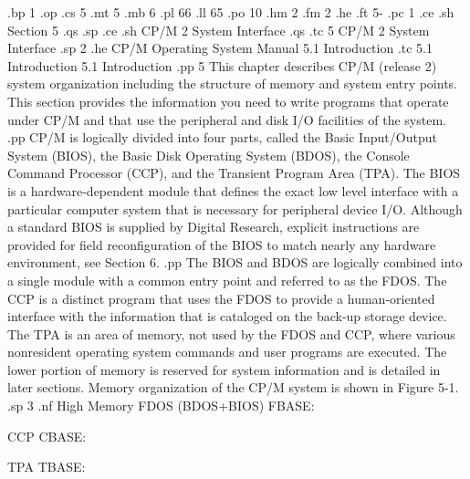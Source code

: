 .bp 1 
.op
.cs 5
.mt 5
.mb 6
.pl 66
.ll 65
.po 10
.hm 2
.fm 2
.he 
.ft                                5-%
.pc 1                                
.ce
.sh
Section 5
.qs
.sp
.ce
.sh
CP/M 2 System Interface
.qs
.tc 5  CP/M 2 System Interface
.sp 2
.he CP/M Operating System Manual                    5.1  Introduction
.tc    5.1  Introduction
5.1  Introduction
.pp 5
This chapter describes CP/M (release 2) system organization including the 
structure of memory and system entry points.  This section provides 
the information you need to write programs that operate under CP/M and 
that use the peripheral and disk I/O facilities of the system.
.pp
CP/M is logically divided into four parts, called the Basic Input/Output 
System (BIOS), the Basic Disk Operating System (BDOS), the Console Command 
Processor (CCP), and the Transient Program Area (TPA).  The BIOS is a 
hardware-dependent module that defines the exact low level interface with a 
particular computer system that is necessary for peripheral device I/O.  
Although a standard BIOS is supplied by Digital Research, explicit 
instructions are provided for field reconfiguration of the BIOS to match 
nearly any hardware environment, see Section 6.  
.pp
The BIOS and BDOS are 
logically combined into a single module with a common entry point and 
referred to as the FDOS.  The CCP is a distinct program that uses the FDOS to 
provide a human-oriented interface with the information that is cataloged on 
the back-up storage device.  The TPA is an area of memory, 
not used by the FDOS and CCP, where various nonresident operating 
system commands and user programs are executed.  The lower portion of memory 
is reserved for system information and is detailed in later sections.  Memory 
organization of the CP/M system is shown in Figure 5-1.
.sp 3
.nf
                  High
                  Memory     FDOS (BDOS+BIOS)
                  FBASE:

                                   CCP
                  CBASE:

                                   TPA
                  TBASE:

